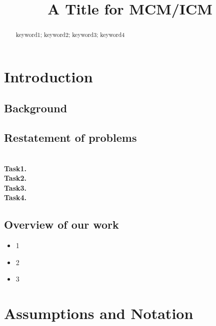 \documentclass{mcmthesis}
\title{A Title for MCM/ICM}
\begin{document}
\begin{abstract}
\par \lipsum[1-4]

\begin{keywords}
  keyword1; keyword2; keyword3; keyword4
\end{keywords}
\end{abstract}
\maketitle


\begin{spacing}{1}
  \tableofcontents
\end{spacing}

 \newpage

\section{Introduction}
\subsection{Background}
\lipsum[5-6]
\subsection{Restatement of problems}
\lipsum[7]\\
\textbf{Task1.} \\
\textbf{Task2.} \\
\textbf{Task3.} \\
\textbf{Task4.} \\
\subsection{Overview of our work}
\lipsum[8]
\renewcommand{}
\begin{itemize}[itemsep= 0 pt,topsep = 2 pt]
\item 1
\item 2
\item 3
\end{itemize}
\section{Assumptions and Notation}
\end{document}
